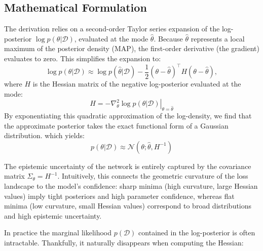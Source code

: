 \subsection{Mathematical Formulation}
The derivation relies on a second-order Taylor series expansion of the log-posterior $\log p(\theta | \mathcal{D})$, evaluated at the mode $\hat{\theta}$. Because $\hat{\theta}$ represents a local maximum of the posterior density (\acs{MAP}), the first-order derivative (the gradient) evaluates to zero. This simplifies the expansion to:
\begin{equation}
    \log p(\theta | \mathcal{D}) \approx \log p(\hat{\theta} | \mathcal{D}) - \frac{1}{2} (\theta - \hat{\theta})^\top H (\theta - \hat{\theta}),
\end{equation}
where $H$ is the Hessian matrix of the negative log-posterior evaluated at the mode:
\begin{equation}
    H = -\left. \nabla^2_\theta \log p(\theta | \mathcal{D}) \right|_{\theta=\hat{\theta}}
\end{equation}
By exponentiating this quadratic approximation of the log-density, we find that the approximate posterior takes the exact functional form of a Gaussian distribution. which yields:
\begin{equation}
    p(\theta | \mathcal{D}) \approx \mathcal{N}(\theta; \hat{\theta}, H^{-1})
\end{equation}

The epistemic uncertainty of the network is entirely captured by the covariance matrix $\Sigma_\theta = H^{-1}$. Intuitively, this connects the geometric curvature of the loss landscape to the model's confidence: sharp minima (high curvature, large Hessian values) imply tight posteriors and high parameter confidence, whereas flat minima (low curvature, small Hessian values) correspond to broad distributions and high epistemic uncertainty.

In practice the marginal likelihood $p(\mathcal{D})$ contained in the log-posterior is often intractable. Thankfully, it naturally disappears when computing the Hessian:


